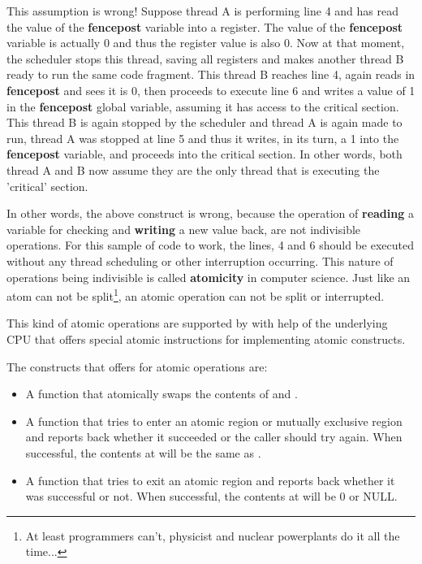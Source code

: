 This assumption is wrong! Suppose thread A is performing line 4 and has read
the value of the \textbf{fencepost} variable into a register. The value of
the \textbf{fencepost} variable is actually 0 and thus the register value is
also 0. Now at that moment, the scheduler stops this thread, saving all
registers and makes another thread B ready to run the same code fragment. This
thread B reaches line 4, again reads in \textbf{fencepost} and sees it is 0,
then proceeds to execute line 6 and writes a value of 1 in the
\textbf{fencepost} global variable, assuming it has access to the critical
section. This thread B is again stopped by the
scheduler and thread A is again made to run, thread A was stopped at line 5
and thus it writes, in its turn, a 1 into the \textbf{fencepost} variable,
and proceeds into the critical section. In
other words, both thread A and B now assume they are the only thread that is
executing the 'critical' section.

In other words, the above construct is wrong, because the operation of
\textbf{reading} a variable for checking and \textbf{writing} a new value back,
are not indivisible operations. For this sample of code to work, the lines,
4 and 6 should be executed without any thread scheduling or other
interruption occurring. This nature of operations being indivisible is called
\textbf{atomicity} in computer science. Just like an atom can not be
split\footnote{At least programmers can't, physicist and nuclear powerplants do it all the time...},
an atomic operation can not be split or interrupted.

This kind of atomic operations are supported by \oswald with help of the
underlying CPU that offers special atomic instructions for implementing atomic
constructs.

The constructs that \oswald offers for atomic operations are:

\begin{itemize}
\item {}

A function that atomically swaps the contents of  and
.

\item {}

A function that tries to enter an atomic region or mutually exclusive
region and reports back whether it succeeded or the caller should try again.
When successful, the contents at  will be the same as .

\item {}

A function that tries to exit an atomic region and reports back whether it
was successful or not. When successful, the contents at 
will be 0 or NULL.
\end{itemize}

